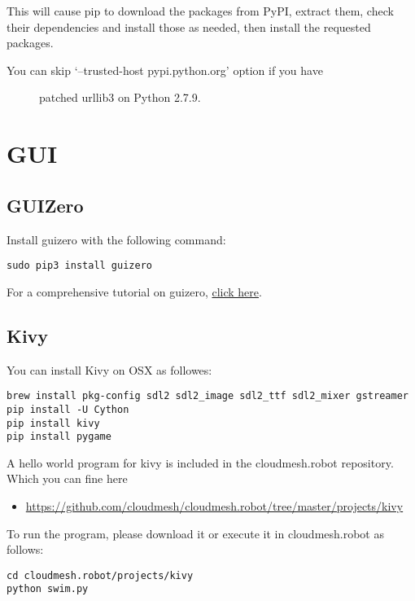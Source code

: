 This will cause pip to download the packages from PyPI, extract them,
check their dependencies and install those as needed, then install the
requested packages.

\begin{description}
\item[You can skip `--trusted-host pypi.python.org' option if you have]
patched urllib3 on Python 2.7.9.
\end{description}

\section{GUI}\label{gui}

\subsection{GUIZero}\label{guizero}

Install guizero with the following command:

\begin{verbatim}
sudo pip3 install guizero
\end{verbatim}

For a comprehensive tutorial on guizero,
\href{https://lawsie.github.io/guizero/howto/}{click here}.

\subsection{Kivy}\label{kivy}

You can install Kivy on OSX as followes:

\begin{verbatim}
brew install pkg-config sdl2 sdl2_image sdl2_ttf sdl2_mixer gstreamer
pip install -U Cython
pip install kivy
pip install pygame
\end{verbatim}

A hello world program for kivy is included in the cloudmesh.robot
repository. Which you can fine here

\begin{itemize}

\item
  \url{https://github.com/cloudmesh/cloudmesh.robot/tree/master/projects/kivy}
\end{itemize}

To run the program, please download it or execute it in cloudmesh.robot
as follows:

\begin{verbatim}
cd cloudmesh.robot/projects/kivy
python swim.py
\end{verbatim}

